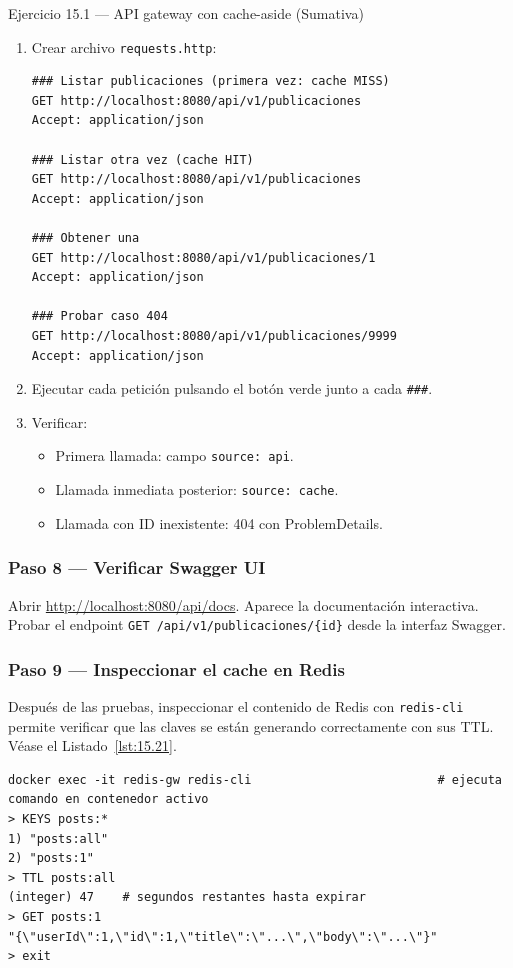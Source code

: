 \documentclass[11pt,a4paper,openany]{book}
\begin{document}
\begin{cajaejercicio}{Ejercicio 15.1 --- API gateway con cache-aside (Sumativa)}
\begin{enumerate}
\item Crear archivo \texttt{requests.http}:
\begin{lstlisting}[style=shell,numbers=none,caption={Ejemplo de Shell},label=lst:15.20]
### Listar publicaciones (primera vez: cache MISS)
GET http://localhost:8080/api/v1/publicaciones
Accept: application/json

### Listar otra vez (cache HIT)
GET http://localhost:8080/api/v1/publicaciones
Accept: application/json

### Obtener una
GET http://localhost:8080/api/v1/publicaciones/1
Accept: application/json

### Probar caso 404
GET http://localhost:8080/api/v1/publicaciones/9999
Accept: application/json
\end{lstlisting}

\item Ejecutar cada petición pulsando el botón verde junto a cada
\texttt{\#\#\#}.

\item Verificar:
\begin{itemize}
\item Primera llamada: campo \texttt{source: api}.
\item Llamada inmediata posterior: \texttt{source: cache}.
\item Llamada con ID inexistente: 404 con ProblemDetails.
\end{itemize}
\end{enumerate}

\subsubsection*{Paso 8 --- Verificar Swagger UI}

Abrir \url{http://localhost:8080/api/docs}. Aparece la documentación
interactiva. Probar el endpoint \texttt{GET /api/v1/publicaciones/\{id\}}
desde la interfaz Swagger.

\subsubsection*{Paso 9 --- Inspeccionar el cache en Redis}

Después de las pruebas, inspeccionar el contenido de Redis
con \texttt{redis-cli} permite verificar que las claves se están
generando correctamente con sus TTL. V\'ease el Listado~\ref{lst:15.21}.


\begin{lstlisting}[style=shell,numbers=none,caption={Ejemplo de Shell},label=lst:15.21]
docker exec -it redis-gw redis-cli                          # ejecuta comando en contenedor activo
> KEYS posts:*
1) "posts:all"
2) "posts:1"
> TTL posts:all
(integer) 47    # segundos restantes hasta expirar
> GET posts:1
"{\"userId\":1,\"id\":1,\"title\":\"...\",\"body\":\"...\"}"
> exit
\end{lstlisting}


\end{cajaejercicio}
\end{document}
